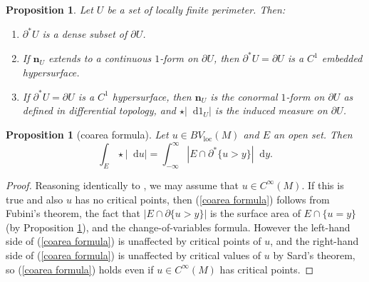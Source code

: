\documentclass[reqno,11pt]{amsart}
\newcommand*\dif{\mathop{}\!\mathrm{d}}
\newcommand{\normal}{\mathbf n}
\newcommand{\loc}{\mathrm{loc}}
\newtheorem{proposition}[theorem]{Proposition}
\theoremstyle{definition}
\numberwithin{equation}{section}
\begin{document}
\begin{proposition}\label{locality of Caccioppoli}
    Let $U$ be a set of locally finite perimeter.
    Then:
    \begin{enumerate}
    \item $\partial^* U$ is a dense subset of $\partial U$.
    \item If $\normal_U$ extends to a continuous $1$-form on $\partial U$, then $\partial^* U = \partial U$ is a $C^1$ embedded hypersurface.
    \item If $\partial^* U = \partial U$ is a $C^1$ hypersurface, then $\normal_U$ is the conormal $1$-form on $\partial U$ as defined in differential topology, and $\star |\dif 1_U|$ is the induced measure on $\partial U$.
\end{enumerate}
\end{proposition}


\begin{proposition}[coarea formula]\label{Coarea2}
Let $u \in BV_\loc(M)$ and $E$ an open set. Then
\begin{equation}\label{coarea formula}
\int_E \star |\dif u| = \int_{-\infty}^\infty |E \cap \partial^* \{u > y\}| \dif y.
\end{equation}
\end{proposition}
\begin{proof}
Reasoning identically to \cite[Theorem 1.23]{Giusti77}, we may assume that $u \in C^\infty(M)$.
If this is true and also $u$ has no critical points, then (\ref{coarea formula}) follows from Fubini's theorem, the fact that $|E \cap \partial \{u > y\}|$ is the surface area of $E \cap \{u = y\}$ (by Proposition \ref{locality of Caccioppoli}), and the change-of-variables formula.
However the left-hand side of (\ref{coarea formula}) is unaffected by critical points of $u$, and the right-hand side of (\ref{coarea formula}) is unaffected by critical values of $u$ by Sard's theorem, so (\ref{coarea formula}) holds even if $u \in C^\infty(M)$ has critical points.
\end{proof}

\end{document}
